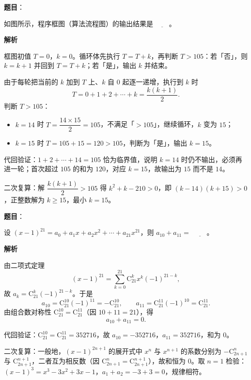 \begin{answer}

\textbf{题目}：

如图所示，程序框图（算法流程图）的输出结果是 $\underline{\qquad}$。
\nopagebreak[4]
\begin{center}\end{center}
\nopagebreak[4]
\textbf{解析}

框图初值 $T=0$，$k=0$。循环体先执行 $T=T+k$，再判断 $T>105$：若「否」，则 $k=k+1$ 并回到 $T=T+k$；若「是」，输出 $k$ 并结束。

由于每轮把当前的 $k$ 加到 $T$ 上、$k$ 自 $0$ 起逐一递增，执行到 $k$ 时
\nopagebreak[4]
\[T=0+1+2+\cdots+k=\frac{k(k+1)}{2}.\]
判断 $T>105$：
\begin{itemize}
\item $k=14$ 时 $T=\dfrac{14\times15}{2}=105$，不满足「$>105$」，继续循环，$k$ 变为 $15$；
\item $k=15$ 时 $T=105+15=120>105$，判断为「是」，输出 $k=15$。
\end{itemize}

代回验证：$1+2+\cdots+14=105$ 恰为临界值，说明 $k=14$ 时仍不输出，必须再进一轮；首次超过 $105$ 的和为 $120$，对应 $k=15$，故输出为 $15$ 而不是 $14$。

二次复算：解 $\dfrac{k(k+1)}{2}>105$ 得 $k^2+k-210>0$，即 $(k-14)(k+15)>0$，正整数解为 $k\geqslant15$，最小 $k=15$。


\end{answer}
\begin{answer}

\textbf{题目}：

设 $(x-1)^{21}=a_0+a_1x+a_2x^2+\cdots+a_{21}x^{21}$，则 $a_{10}+a_{11}=$ $\underline{\qquad}$。

\textbf{解析}

由二项式定理
\nopagebreak[4]
\[(x-1)^{21}=\sum_{k=0}^{21}\mathrm C_{21}^{k}x^{k}(-1)^{21-k},\]
故 $a_k=\mathrm C_{21}^{k}(-1)^{21-k}$。于是
\nopagebreak[4]
\[a_{10}=\mathrm C_{21}^{10}(-1)^{11}=-\mathrm C_{21}^{10},\qquad a_{11}=\mathrm C_{21}^{11}(-1)^{10}=\mathrm C_{21}^{11}.\]
由组合数对称性 $\mathrm C_{21}^{10}=\mathrm C_{21}^{11}$（因 $10+11=21$），得
\nopagebreak[4]
\[a_{10}+a_{11}=0.\]

代回验证：$\mathrm C_{21}^{10}=\mathrm C_{21}^{11}=352716$，故 $a_{10}=-352716$，$a_{11}=352716$，和为 $0$。

二次复算：一般地，$(x-1)^{2n+1}$ 的展开式中 $x^{n}$ 与 $x^{n+1}$ 的系数分别为 $-\mathrm C_{2n+1}^{n}$ 与 $\mathrm C_{2n+1}^{n+1}$，二者互为相反数（因 $\mathrm C_{2n+1}^{n}=\mathrm C_{2n+1}^{n+1}$），故和恒为 $0$。取 $n=1$ 检验：$(x-1)^3=x^3-3x^2+3x-1$，$a_1+a_2=-3+3=0$，规律相符。


\end{answer}
